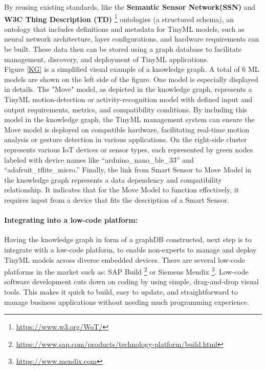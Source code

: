 \documentclass[twocolumn]{article}
\begin{document}
By reusing existing standards, like the \textbf{Semantic Sensor Network(SSN)} and \textbf{W3C Thing Description (TD)}  \footnote{\url{https://www.w3.org/WoT/}}
ontologies (a structured schema), an ontology that includes definitions and metadata for TinyML models, such as neural network architecture, layer configurations, and hardware requirements can be built. These data then can be stored using a graph database to facilitate management, discovery, and deployment of TinyML applications.\\[0.1cm]

Figure \ref{KG} is a simplified visual example of a knowledge graph. A total of 6 ML models are shown on the left side of the figure. One model is especially displayed in details. The "Move" model, as depicted in the knowledge graph, represents a TinyML motion-detection or activity-recognition model with defined input and output requirements, metrics, and compatibility conditions. By including this model in the knowledge graph, the TinyML management system can ensure the Move model is deployed on compatible hardware, facilitating real-time motion analysis or gesture detection in various applications. On the right-side cluster represents various IoT devices or sensor types, each represented by green nodes labeled with device names like “arduino\_nano\_ble\_33” and “adafruit\_tflite\_micro.” Finally, the link from Smart Sensor to Move Model in the knowledge graph represents a data dependency and compatibility relationship. It indicates that for the Move Model to function effectively, it requires input from a device that fits the description of a Smart Sensor.\\[0.1cm]

\paragraph{Integrating into a low-code platform:}
Having the knowledge graph in form of a graphDB constructed, next step is to integrate with a low-code platform, to enable non-experts to manage and deploy TinyML models across diverse embedded devices. There are several low-code platforms in the market such as: SAP Build \footnote{\url{https://www.sap.com/products/technology-platform/build.html}} or Siemens Mendix \footnote{\url{https://www.mendix.com}}. Low-code software development cuts down on coding by using simple, drag-and-drop visual tools. This makes it quick to build, easy to update, and straightforward to manage business applications without needing much programming experience.\\[0.1cm]
\end{document}
